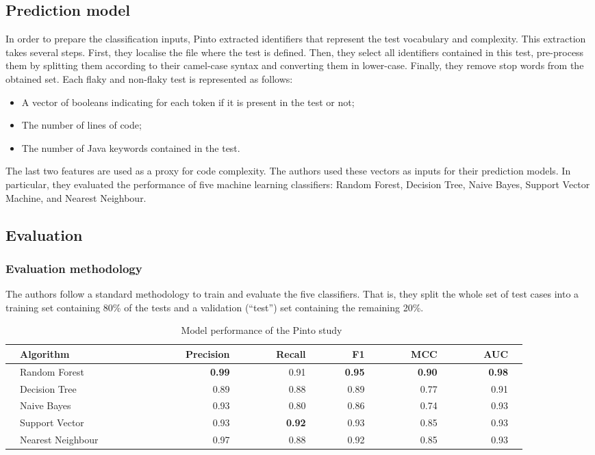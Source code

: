 \subsection{Prediction model}
In order to prepare the classification inputs, Pinto \etal extracted identifiers that represent the test vocabulary and complexity. 
This extraction takes several steps. First, they localise the file where the test is defined. Then, they select all identifiers contained in this test, pre-process them by splitting them according to their camel-case syntax and converting them in lower-case. Finally, they remove stop words from the obtained set. Each flaky and non-flaky test is represented as follows:
\begin{itemize}
    \item A vector of booleans indicating for each token if it is present in the test or not;
    \item The number of lines of code;
    \item The number of Java keywords contained in the test.
\end{itemize}  
The last two features are used as a proxy for code complexity.
The authors used these vectors as inputs for their prediction models.
In particular, they evaluated the performance of five machine learning classifiers: Random Forest, Decision Tree, Naive Bayes, Support Vector Machine, and Nearest Neighbour. 
\subsection{Evaluation}
\subsubsection{Evaluation methodology}
The authors follow a standard methodology to train and evaluate the five classifiers. That is, they split the whole set of test cases into a training set containing 80\% of the tests and a validation (``test'') set containing the remaining 20\%.


\begin{table*}[t]
\vspace{1.0em}
\centering
    \caption{Model performance of the Pinto \etal study~\cite{Pinto2020}}
\label{table:resultsPinto}
\begin{tabular}{l l|r r r r r r} 
 \hline
  & \textbf{Algorithm ~~~~~~~~~~~~} & \textbf{~~~~~~ Precision} & \textbf{~~~~~~ Recall} & \textbf{~~~~~~ F1} & \textbf{~~~~~~ MCC} & \textbf{~~~~~~ AUC} & \\ %
 \hline
  & Random Forest & \textbf{0.99} & 0.91 & \textbf{0.95} & \textbf{0.90} & \textbf{0.98}  &  \\
  & Decision Tree & 0.89 & 0.88 & 0.89 & 0.77 & 0.91  &  \\
  & Naive Bayes & 0.93 & 0.80 & 0.86 & 0.74 & 0.93  &  \\ 
  & Support Vector & 0.93 & \textbf{0.92} & 0.93 & 0.85 & 0.93  &  \\
  & Nearest Neighbour & 0.97 & 0.88 & 0.92 & 0.85 & 0.93  &  \\
 \hline
\end{tabular}
\vspace{1.0em}
\end{table*}


